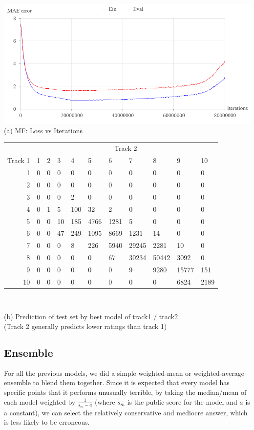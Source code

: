 \documentclass{article}
\begin{document}
\begin{table}[ht]
\begin{minipage}[b]{.45\textwidth}
\centering
\includegraphics[width=\linewidth]{mf_error_vs_iter.png}\\
(a) MF: Loss vs Iterations
\end{minipage}
\begin{minipage}[b]{.55\textwidth}
\setlength{\tabcolsep}{3pt}
\centering \footnotesize
\begin{tabular}{r|llllllllll}
&\multicolumn{10}{c}{Track 2}\\
Track 1&1&2&3&4&5&6&7&8&9&10 \\
\midrule
1&0&0&0&0&0&0&0&0&0&0\\
2&0&0&0&0&0&0&0&0&0&0\\
3&0&0&0&2&0&0&0&0&0&0\\
4&0&1&5&100&32&2&0&0&0&0\\
5&0&0&10&185&4766&1281&5&0&0&0\\
6&0&0&47&249&1095&8669&1231&14&0&0\\
7&0&0&0&8&226&5940&29245&2281&10&0\\
8&0&0&0&0&0&67&30234&50442&3092&0\\
9&0&0&0&0&0&0&9&9280&15777&151\\
10&0&0&0&0&0&0&0&0&6824&2189\\
\bottomrule
\end{tabular}\\
\normalsize



(b) Prediction of test set by best model of track1 / track2 \\
(Track 2 generally predicts lower ratings than track 1)
\end{minipage}
\end{table}

\subsection{Ensemble}
For all the previous models, we did a simple weighted-mean or weighted-average ensemble to blend them together. Since it is expected that every model has specific points that it performs unusually terrible, by taking the median/mean of each model weighted by $\frac{1}{s_m-a}$ (where $s_m$ is the public score for the model and $a$ is a constant), we can select the relatively conservative and mediocre answer, which is less likely to be erroneous.
\end{document}
